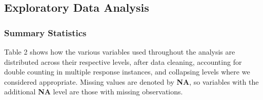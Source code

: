 \documentclass[
  10pt,
]{article}
\begin{document}
\hypertarget{exploratory-data-analysis}{%
\subsection{Exploratory Data Analysis}\label{exploratory-data-analysis}}

\hypertarget{summary-statistics}{%
\subsubsection{Summary Statistics}\label{summary-statistics}}

Table 2 shows how the various variables used throughout the analysis are distributed across their respective levels, after data cleaning, accounting for double counting in multiple response instances, and collapsing levels where we considered appropriate. Missing values are denoted by \textbf{NA}, so variables with the additional \textbf{NA} level are those with missing observations.

\begingroup\fontsize{9}{11}\selectfont
\end{document}
